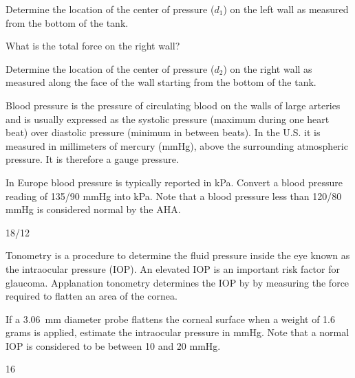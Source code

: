 \documentclass[multi,preview,varwidth=false,border=5,12pt]{standalone}
\begin{document}
\begin{question}
Determine the location of the center of pressure
($d_1$) on the left wall as measured from the
bottom of the tank.
\end{question}

\begin{question}
What is the total force on the right wall?
\end{question}

\begin{question}
Determine the location of the center of pressure
($d_2$) on the right wall as measured along the
face of the wall starting from the bottom of
the tank.
\end{question}


\begin{question}
Blood pressure is the pressure of circulating blood on the walls of large arteries and is usually expressed as the systolic pressure (maximum during one heart beat) over diastolic pressure (minimum in between beats).  In the U.S. it is measured in millimeters of mercury (mmHg), above the surrounding atmospheric pressure.  It is therefore a gauge pressure.

In Europe blood pressure is typically reported in kPa.  Convert a blood pressure reading of 135/90 mmHg into kPa.   Note that a blood pressure less than 120/80 mmHg is considered normal by the AHA.

\begin{solution}
18/12
\end{solution}

\end{question}

\begin{question}

Tonometry is a procedure to determine the fluid pressure inside the eye known as the intraocular pressure (IOP).  An elevated IOP is an important risk factor for glaucoma.  Applanation tonometry determines the IOP by by measuring the force required to flatten an area of the cornea.

If a 3.06~mm diameter probe flattens the corneal surface when a weight of 1.6 grams is applied, estimate the intraocular pressure in mmHg.  Note that a normal IOP is considered to be between 10 and 20 mmHg.

\begin{solution}
16
\end{solution}

\end{question}
\end{document}
